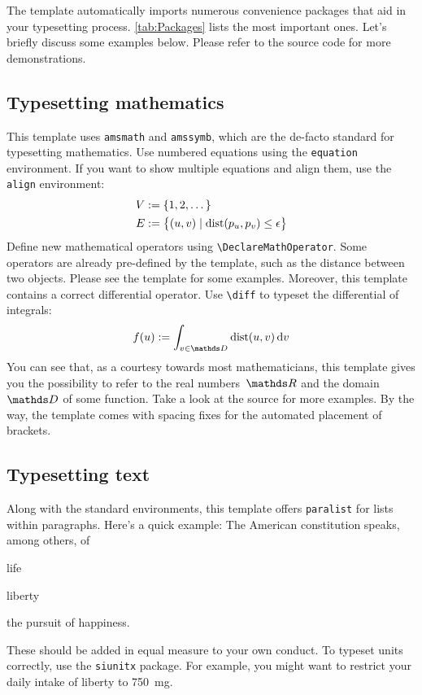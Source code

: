 The template automatically imports numerous convenience packages that
aid in your typesetting process. \autoref{tab:Packages} lists the
most important ones. Let's briefly discuss some examples below. Please
refer to the source code for more demonstrations.

\subsection{Typesetting mathematics}

This template uses \verb|amsmath| and \verb|amssymb|, which are the
de-facto standard for typesetting mathematics. Use numbered equations
using the \verb|equation| environment.
%
If you want to show multiple equations and align them, use the
\verb|align| environment:
%
\begin{align}
    V &:= \{ 1, 2, \dots \}\\
    E &:= \big\{ \left(u,v\right) \mid \dist\left(p_u, p_v\right) \leq \epsilon \big\}
\end{align}
%
Define new mathematical operators using \verb|\DeclareMathOperator|.
Some operators are already pre-defined by the template, such as the
distance between two objects. Please see the template for some examples.
%
Moreover, this template contains a correct differential operator. Use \verb|\diff| to typeset the differential of integrals:
%
\begin{equation}
  f(u) := \int_{v \in \domain}\dist(u,v)\diff{v}
\end{equation}
%
You can see that, as a courtesy towards most mathematicians, this
template gives you the possibility to refer to the real numbers~$\real$
and the domain~$\domain$ of some function. Take a look at the source for
more examples. By the way, the template comes with spacing fixes for the
automated placement of brackets.

\subsection{Typesetting text}

Along with the standard environments, this template offers
\verb|paralist| for lists within paragraphs.
%
Here's a quick example: The American constitution speaks, among others, of
%
\begin{inparaenum}[(i)]
  \item life
  \item liberty
  \item the pursuit of happiness.
\end{inparaenum}
%
These should be added in equal measure to your own conduct. To typeset
units correctly, use the \verb|siunitx| package. For example, you might
want to restrict your daily intake of liberty to \SI{750}{\milli\gram}.

